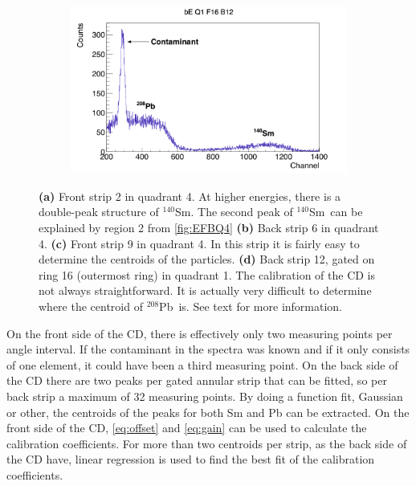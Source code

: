 \documentclass[twoside,english]{uiofysmaster/uiofysmaster}
\newcommand{\Sm}{$^{140}$Sm} %
\newcommand{\Pb}{$^{208}$Pb}
\let\orgautoref\autoref
\renewcommand{\autoref}
        {%
		 \def\sectionautorefname{Section}%
		 \def\subsectionautorefname{Section}%
		 \def\subsubsectionautorefname{Section}%
		 \def\chapterautorefname{Chapter}%
          \orgautoref}
\begin{document}
\begin{figure}[ht]
\begin{subfigure}[t]{0.49\textwidth}
		\caption{}
		\label{fig:CD_cal_easy}
	\end{subfigure}
	\hfill
	\begin{subfigure}[t]{0.49\textwidth}
		\centering
		\includegraphics[width=\textwidth]{../Plots/plotting/bE_Q1_f16_b12.png}
		\caption{}
		\label{fig:CD_cal_difficult}
	\end{subfigure}
	\caption{\textbf{(a)} Front strip 2 in quadrant 4. 
	At higher energies, there is a double-peak structure of \Sm. 
	The second peak of \Sm\ can be explained by region 2 from \autoref{fig:EFBQ4}
	\textbf{(b)} Back strip 6 in quadrant 4.
	\textbf{(c)} Front strip 9 in quadrant 4. 
	In this strip it is fairly easy to determine the centroids of the particles.
	\textbf{(d)} Back strip 12, gated on ring 16 (outermost ring) in quadrant 1. 
	The calibration of the CD is not always straightforward. 
	It is actually very difficult to determine where the centroid of \Pb\ is.
	See text for more information.}
	\label{fig:cal_ED}
\end{figure}

On the front side of the CD, there is effectively only two measuring points per angle interval. 
If the contaminant in the spectra was known and if it only consists of one element, it could have been a third measuring point.  
On the back side of the CD there are two peaks per gated annular strip that can be fitted, so per back strip a maximum of 32 measuring points. 
By doing a function fit, Gaussian or other, the centroids of the peaks for both Sm and Pb can be extracted. 
On the front side of the CD, \autoref{eq:offset} and \autoref{eq:gain} can be used to calculate the calibration coefficients.
For more than two centroids per strip, as the back side of the CD have, linear regression is used to find the best fit of the calibration coefficients.
\end{document}
